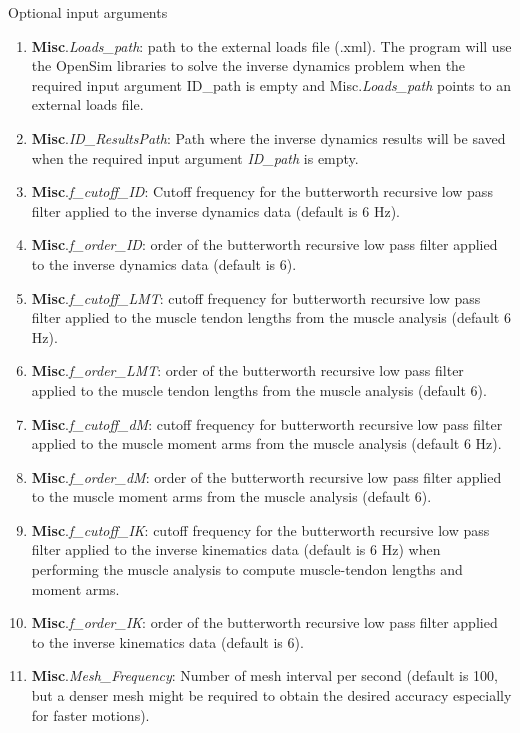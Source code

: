 \documentclass[a4paper,oneside,11pt]{article}
\begin{document}
Optional input arguments
\begin{enumerate}
	\item \textbf{Misc}.\textit{Loads_path}: path to the external loads file (.xml). The program will use the OpenSim libraries to solve the inverse dynamics problem when the required input argument ID_path is empty and Misc.\textit{Loads_path} points to an external loads file.
	\item \textbf{Misc}.\textit{ID_ResultsPath}: Path where the inverse dynamics results will be saved when the required input argument \textit{ID_path} is empty.
	\item \textbf{Misc}.\textit{f_cutoff_ID}: Cutoff frequency for the butterworth recursive low pass filter applied to the inverse dynamics data (default is 6 Hz).
	\item \textbf{Misc}.\textit{f_order_ID}: order of the butterworth recursive low pass filter applied to the inverse dynamics data (default is 6).
	
	\item \textbf{Misc}.\textit{f_cutoff_LMT}: cutoff frequency for butterworth recursive low pass filter applied to the muscle tendon lengths from the muscle analysis (default 6 Hz).
	\item \textbf{Misc}.\textit{f_order_LMT}: order of the butterworth recursive low pass filter applied to the muscle tendon lengths from the muscle analysis (default 6).		
	
	\item \textbf{Misc}.\textit{f_cutoff_dM}: cutoff frequency for butterworth recursive low pass filter applied to the muscle moment arms from the muscle analysis (default 6 Hz).
	\item \textbf{Misc}.\textit{f_order_dM}: order of the butterworth recursive low pass filter applied to the muscle moment arms from the muscle analysis (default 6).

	\item \textbf{Misc}.\textit{f_cutoff_IK}: cutoff frequency for the butterworth recursive low pass filter applied to the inverse kinematics data (default is 6 Hz) when performing the muscle analysis to compute muscle-tendon lengths and moment arms.
	\item \textbf{Misc}.\textit{f_order_IK}: order of the butterworth recursive low pass filter applied to the inverse kinematics data (default is 6).

	\item \textbf{Misc}.\textit{Mesh_Frequency}: Number of mesh interval per second (default is 100, but a denser mesh might be required to obtain the desired accuracy especially for faster motions).

\end{enumerate}
\end{document}
